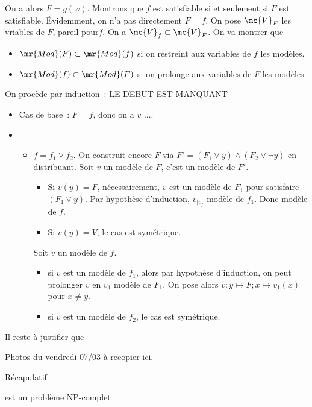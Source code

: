 \begin{demonstration}
    On a alors $F = g(\varphi)$. Montrons que $f$ est satisfiable si et seulement si $F$ est satisfiable. Évidemment, on n'a pas directement $F = f$. On pose $\mc{V}_F$ les vriables de $F$, pareil pour$f$. On a $\mc{V}_f \subset \mc{V}_F$. On va montrer que
    \begin{itemize}
        \item $\mr{Mod}(F) \subset \mr{Mod}(f)$ si on restreint aux variables de $f$ les modèles.
        \item $\mr{Mod}(f) \subset \mr{Mod}(F)$ si on prolonge aux variables de $F$ les modèles.
    \end{itemize}
    On procède par induction~: LE DEBUT EST MANQUANT
    \begin{itemize}
        \item Cas de base~: $F = f$, donc on a $v$ ....
        \item \begin{itemize}
            \item $f = f_1 \vee f_2$. On construit encore $F$ via $F' = (F_1 \vee y) \wedge (F_2 \vee \lnot y)$ en distribuant. Soit $v$ un modèle de $F$, c'est un modèle de $F'$.
            \begin{itemize}
                \item Si $v(y) = F$, nécessairement, $v$ est un modèle de $F_1$ pour satisfaire $(F_1 \vee y)$. Par hypothèse d'induction, $v_{|v_f}$ modèle de $f_1$. Donc modèle de $f$.
                \item Si $v(y) = V$, le cas est symétrique.
            \end{itemize}
            Soit $v$ un modèle de $f$.
            \begin{itemize}
                \item si $v$ est un modèle de $f_1$, alors par hypothèse d'induction, on peut prolonger $v$ en $v_1$ modèle de $F_1$. On pose alors $\widetilde{v} : y \mapsto F; x \mapsto v_1(x)$ pour $x \neq y$.
                \item si $v$ est un modèle de $f_2$, le cas est symétrique.
            \end{itemize}
        \end{itemize}
    \end{itemize}
    Il reste à justifier que 
\end{demonstration}

Photos du vendredi 07/03 à recopier ici.

Récapulatif
\begin{proposition}{}{}
    \troissat est un problème NP-complet
\end{proposition}

